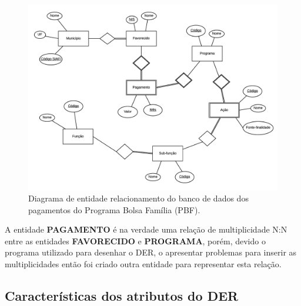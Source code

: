 \documentclass[12pt]{article}
\begin{document}
	\begin{figure}[H]
		\centering
		\includegraphics[width=1\textwidth]{der.png}
		\caption{Diagrama de entidade relacionamento do banco de dados dos pagamentos do Programa Bolsa Família (PBF).}
		\label{fig:der}
	\end{figure}
	
	A entidade \textbf{PAGAMENTO} é na verdade uma relação de multiplicidade N:N entre as entidades \textbf{FAVORECIDO} e \textbf{PROGRAMA}, porém, devido o programa utilizado para desenhar o DER, o \cite{lucid} apresentar problemas para inserir as multiplicidades então foi criado outra entidade para representar esta relação.
	
	\subsection{Características dos atributos do DER}
	\label{sec:atr}
	
\end{document}
